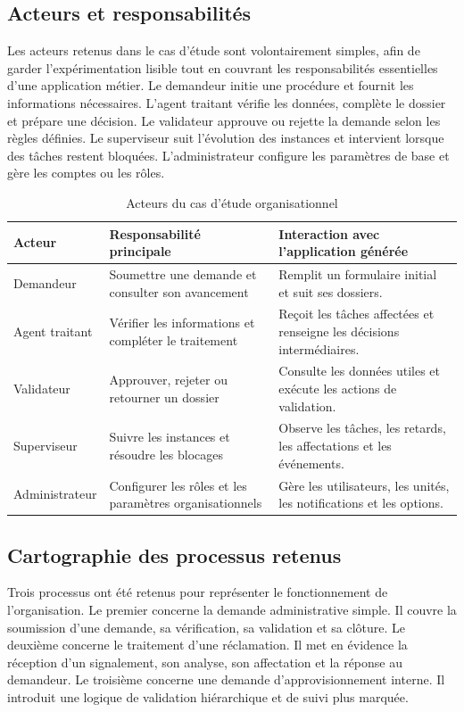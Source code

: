 \subsection{Acteurs et responsabilités}

Les acteurs retenus dans le cas d'étude sont volontairement simples, afin de garder l'expérimentation lisible tout en couvrant les responsabilités essentielles d'une application métier. Le demandeur initie une procédure et fournit les informations nécessaires. L'agent traitant vérifie les données, complète le dossier et prépare une décision. Le validateur approuve ou rejette la demande selon les règles définies. Le superviseur suit l'évolution des instances et intervient lorsque des tâches restent bloquées. L'administrateur configure les paramètres de base et gère les comptes ou les rôles.

\begin{table}[H]
\centering
\small
\caption{Acteurs du cas d'étude organisationnel}
\label{tab:chap4-acteurs-cas-etude}
\begin{tabular}{p{3.2cm}p{5.3cm}p{5.0cm}}
\hline
\textbf{Acteur} & \textbf{Responsabilité principale} & \textbf{Interaction avec l'application générée} \\
\hline
Demandeur & Soumettre une demande et consulter son avancement & Remplit un formulaire initial et suit ses dossiers. \\
Agent traitant & Vérifier les informations et compléter le traitement & Reçoit les tâches affectées et renseigne les décisions intermédiaires. \\
Validateur & Approuver, rejeter ou retourner un dossier & Consulte les données utiles et exécute les actions de validation. \\
Superviseur & Suivre les instances et résoudre les blocages & Observe les tâches, les retards, les affectations et les événements. \\
Administrateur & Configurer les rôles et les paramètres organisationnels & Gère les utilisateurs, les unités, les notifications et les options. \\
\hline
\end{tabular}
\end{table}

\subsection{Cartographie des processus retenus}

Trois processus ont été retenus pour représenter le fonctionnement de l'organisation. Le premier concerne la demande administrative simple. Il couvre la soumission d'une demande, sa vérification, sa validation et sa clôture. Le deuxième concerne le traitement d'une réclamation. Il met en évidence la réception d'un signalement, son analyse, son affectation et la réponse au demandeur. Le troisième concerne une demande d'approvisionnement interne. Il introduit une logique de validation hiérarchique et de suivi plus marquée.

